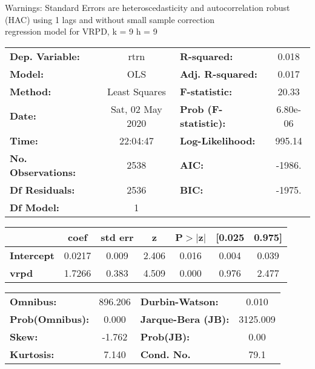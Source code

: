 Warnings: \newline
 [1] Standard Errors are heteroscedasticity and autocorrelation robust (HAC) using 1 lags and without small sample correction\\ 

regression model for VRPD, k = 9 h = 9\begin{center}
\begin{tabular}{lclc}
\toprule
\textbf{Dep. Variable:}    &       rtrn       & \textbf{  R-squared:         } &     0.018   \\
\textbf{Model:}            &       OLS        & \textbf{  Adj. R-squared:    } &     0.017   \\
\textbf{Method:}           &  Least Squares   & \textbf{  F-statistic:       } &     20.33   \\
\textbf{Date:}             & Sat, 02 May 2020 & \textbf{  Prob (F-statistic):} &  6.80e-06   \\
\textbf{Time:}             &     22:04:47     & \textbf{  Log-Likelihood:    } &    995.14   \\
\textbf{No. Observations:} &        2538      & \textbf{  AIC:               } &    -1986.   \\
\textbf{Df Residuals:}     &        2536      & \textbf{  BIC:               } &    -1975.   \\
\textbf{Df Model:}         &           1      & \textbf{                     } &             \\
\bottomrule
\end{tabular}
\begin{tabular}{lcccccc}
                   & \textbf{coef} & \textbf{std err} & \textbf{z} & \textbf{P$> |$z$|$} & \textbf{[0.025} & \textbf{0.975]}  \\
\midrule
\textbf{Intercept} &       0.0217  &        0.009     &     2.406  &         0.016        &        0.004    &        0.039     \\
\textbf{vrpd}      &       1.7266  &        0.383     &     4.509  &         0.000        &        0.976    &        2.477     \\
\bottomrule
\end{tabular}
\begin{tabular}{lclc}
\textbf{Omnibus:}       & 896.206 & \textbf{  Durbin-Watson:     } &    0.010  \\
\textbf{Prob(Omnibus):} &   0.000 & \textbf{  Jarque-Bera (JB):  } & 3125.009  \\
\textbf{Skew:}          &  -1.762 & \textbf{  Prob(JB):          } &     0.00  \\
\textbf{Kurtosis:}      &   7.140 & \textbf{  Cond. No.          } &     79.1  \\
\bottomrule
\end{tabular}
\end{center}

